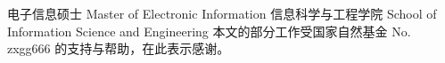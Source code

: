 \documentclass[algorithmlist,figurelist,tablelist,nomlist,nocolorlinks,bookmarksnumbered]{template/seumasterthesis}
\begin{document}
\degreetype                        %
    {电子信息硕士}
    {Master of Electronic Information}
{}        %
\committeechair{}               %
\reviewer{}{}                %
\department                        %
    {信息科学与工程学院}
    {School of Information Science and Engineering}
\seuthesisthanks                %
    {本文的部分工作受国家自然基金 No. zxgg666 的支持与帮助，在此表示感谢。}


\makebigcover  %
\makecover     %
	 

\cleardoublepage
\seuTocAndListVSpaceOff   %
\seuTableOfContents      %
\listofothers             %
 
\end{document}
